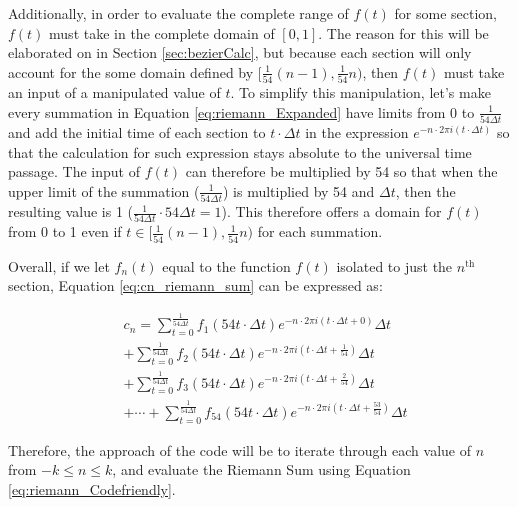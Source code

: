 \documentclass[letterpaper, 12pt]{article}
\begin{document}
Additionally, in order to evaluate the complete range of \(f(t)\)
for some section, \(f(t)\) must take in the complete domain of
\([0, 1]\). The reason for this will be elaborated on in
Section \ref*{sec:bezierCalc}, but because each section will only
account for the some domain defined by \([\frac{1}{54}(n-1), \frac{1}{54}n)\),
then \(f(t)\) must take an input of a manipulated value of \(t\).
To simplify this manipulation, let's make every summation in
Equation \ref*{eq:riemann_Expanded} have limits from 0 to
\(\frac{1}{54\Delta t}\) and add the initial time of each
section to \(t \cdot \Delta t\) in the expression
\(e^{-n \cdot 2\pi i(t \cdot \Delta t)}\) so that
the calculation for such expression stays absolute to the universal
time passage. The input of \(f(t)\) can therefore be multiplied
by 54 so that when the upper limit of the summation (\(\frac{1}{54\Delta t}\))
is multiplied by 54 and \(\Delta t\), then the resulting value
is 1 (\(\frac{1}{54\Delta t} \cdot 54\Delta t = 1\)).
This therefore offers a domain for \(f(t)\) from 0 to 1 even if
\(t \in [\frac{1}{54}(n-1), \frac{1}{54}n)\) for each
summation.


Overall, if we let \(f_n(t)\) equal to the function \(f(t)\) isolated
to just the \(n^{\text{th}}\) section,
Equation \ref*{eq:cn_riemann_sum} can
be expressed as:

\begin{equation}
    \begin{aligned} \label{eq:riemann_Codefriendly}
         & c_n = \sum_{t = 0}^{\frac{1}{54\Delta t}} f_1(54t \cdot \Delta t) e^{-n \cdot 2\pi i(t \cdot \Delta t + 0)} \Delta t
        \\
         & + \sum_{t = 0}^{\frac{1}{54\Delta t}} f_2(54t \cdot \Delta t) e^{-n \cdot 2\pi i(t \cdot \Delta t + \frac{1}{54})} \Delta t
        \\
         & + \sum_{t = 0}^{\frac{1}{54\Delta t}} f_3(54t \cdot \Delta t) e^{-n \cdot 2\pi i(t \cdot \Delta t + \frac{2}{54})} \Delta t
        \\
         & + \cdots +
        \sum_{t = 0}^{\frac{1}{54\Delta t}} f_{54}(54t \cdot \Delta t) e^{-n \cdot 2\pi i(t \cdot \Delta t + \frac{53}{54})} \Delta t
    \end{aligned}
\end{equation}

Therefore, the approach of the code will be to iterate through
each value of \(n\) from \(-k \le n \le k\), and evaluate
the Riemann Sum using Equation \ref*{eq:riemann_Codefriendly}.
\end{document}
